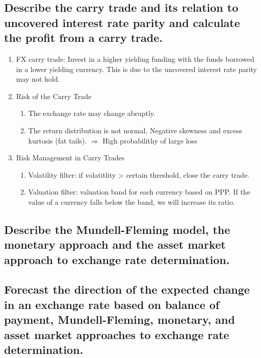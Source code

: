 \documentclass{article}
\newcommand{\be}{\begin{enumerate}}
\newcommand{\ee}{\end{enumerate}}
\begin{document}
\subsection{Describe the carry trade and its relation to uncovered interest rate
parity and calculate the profit from a carry trade.}
\be
    \item FX carry trade: Invest in a higher yielding funding with the funds borrowed in
        a lower yielding currency. This is due to the uncovered interest rate parity may not
        hold.
    \item Risk of the Carry Trade
        \be
            \item The exchange rate may change abruptly.
            \item The return distribution is not normal. Negative skewness and 
                excess kurtosis (fat tails). $\Rightarrow$ High probabilithy of large loss
        \ee
    \item Risk Management in Carry Trades
        \be
            \item Volatility filter: if volatitlity > certain threshold, close the carry trade.
            \item Valuation filter: valuation band for each currency based on PPP. If the value
                of a currency falls below the band, we will increase its ratio.
        \ee
\ee
\subsection{Describe the Mundell-Fleming model, the monetary approach and the asset
market approach to exchange rate determination.}
\subsection{Forecast the direction of the expected change in an exchange rate based on
balance of payment, Mundell-Fleming, monetary, and asset market approaches to exchange rate determination.}
\end{document}
